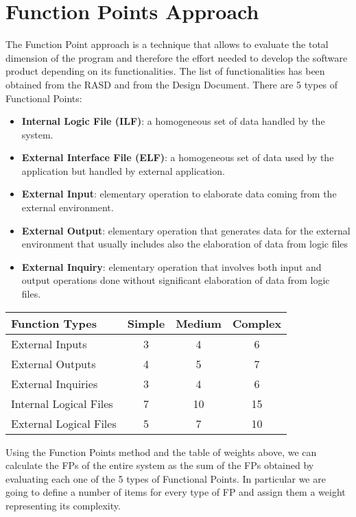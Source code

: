 \chapter{Function Points Approach} \label{chap2}
The Function Point approach is a technique that allows to evaluate the total dimension of the program and therefore the effort needed to develop the software product depending on its functionalities. 
The list of functionalities has been obtained from the RASD and from the Design Document. There are 5 types of Functional Points:

\begin{itemize}
	\item \textbf{Internal Logic File (ILF)}: a homogeneous set of data handled by the system.
	\item \textbf{External Interface File (ELF)}: a homogeneous set of data used by the application but handled by external application.
	\item \textbf{External Input}: elementary operation to elaborate data coming from the external environment.
	\item \textbf{External Output}: elementary operation that generates data for the external environment that usually includes also the elaboration of data from logic files
	\item \textbf{External Inquiry}: elementary operation that involves both input and output operations done without significant elaboration of data from logic files.
\end{itemize}
\clearpage

\begin{table}[!htbp]
\begin{center}
\begin{tabular}[t]{|p{}|c|c|c|}
\hline
\textbf{Function Types} & \textbf{Simple} & \textbf{Medium} & \textbf{Complex}\\
\hline
\hline
External Inputs & 3 & 4 & 6 \\
\hline
External Outputs & 4 & 5 & 7 \\
\hline
External Inquiries & 3 & 4 & 6 \\
\hline
Internal Logical Files & 7 & 10 & 15 \\
\hline
External Logical Files & 5 & 7 & 10 \\
\hline
\end{tabular}
\end{center}
\end{table}

\noindent Using the Function Points method and the table of weights above, we can calculate the FPs of the entire system as the sum of the FPs obtained by evaluating each one of the 5 types of Functional Points. In particular we are going to define a number of items for every type of FP and assign them a weight representing its complexity.

